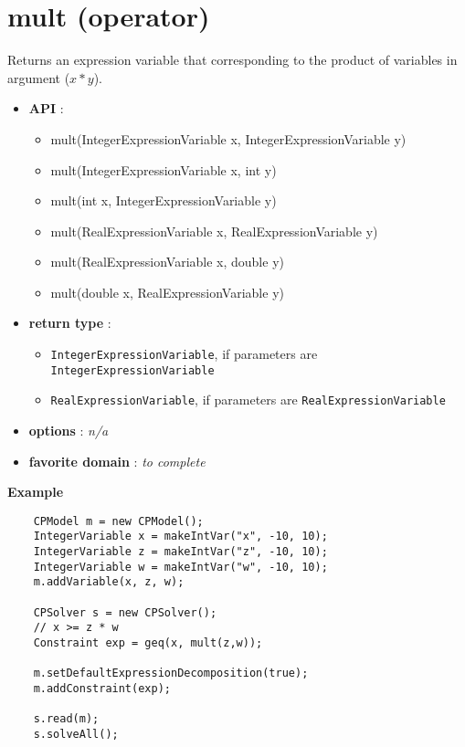 \label{mult}
\hypertarget{mult}{}

\section{mult (operator)}\label{mult:multoperator}\hypertarget{mult:multoperator}{}
Returns an expression variable that corresponding to the product of variables in argument (\(x*y\)).

\begin{itemize}
	\item \textbf{API} :
	\begin{itemize}
		\item mult(IntegerExpressionVariable x, IntegerExpressionVariable y)
		\item mult(IntegerExpressionVariable x, int y)
		\item mult(int x, IntegerExpressionVariable y)
		\item mult(RealExpressionVariable x, RealExpressionVariable y)
		\item mult(RealExpressionVariable x, double y)
		\item mult(double x, RealExpressionVariable y)
	\end{itemize}
	\item \textbf{return type} :
	\begin{itemize}
		\item \texttt{IntegerExpressionVariable}, if parameters are \texttt{IntegerExpressionVariable}
		\item \texttt{RealExpressionVariable}, if parameters are \texttt{RealExpressionVariable}
	\end{itemize}
	\item \textbf{options} : \emph{n/a}
	\item \textbf{favorite domain} : \emph{to complete}
\end{itemize}

\textbf{Example}
\begin{lstlisting}
	CPModel m = new CPModel();
	IntegerVariable x = makeIntVar("x", -10, 10);
	IntegerVariable z = makeIntVar("z", -10, 10);
	IntegerVariable w = makeIntVar("w", -10, 10);
	m.addVariable(x, z, w);
	
	CPSolver s = new CPSolver();
	// x >= z * w
	Constraint exp = geq(x, mult(z,w));
	
	m.setDefaultExpressionDecomposition(true);
	m.addConstraint(exp);
	
	s.read(m);
	s.solveAll();
\end{lstlisting}
